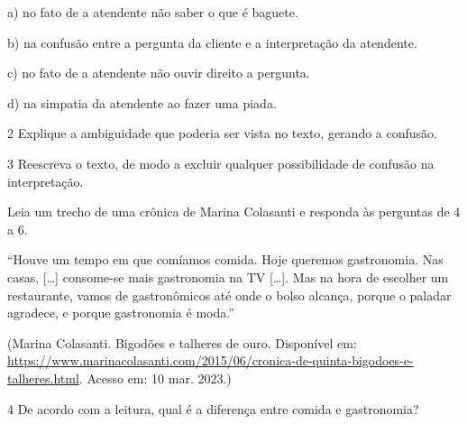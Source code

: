 {a) no fato de a atendente não saber o que é baguete.

b) na confusão entre a pergunta da cliente e a interpretação da
atendente.

c) no fato de a atendente não ouvir direito a pergunta.

d) na simpatia da atendente ao fazer uma piada.


\num{2} Explique a ambiguidade que poderia ser vista no texto, gerando a
confusão.



\num{3} Reescreva o texto, de modo a excluir qualquer possibilidade de
confusão na interpretação.



Leia um trecho de uma crônica de Marina Colasanti e responda às
perguntas de 4 a 6.

``Houve um tempo em que comíamos comida. Hoje queremos gastronomia. Nas
casas, {[}\ldots{]} consome-se mais gastronomia na TV {[}\ldots{]}. Mas
na hora de escolher um restaurante, vamos de gastronômicos até onde o
bolso alcança, porque o paladar agradece, e porque gastronomia é moda.''

(Marina Colasanti. Bigodões e talheres de ouro. Disponível em:
\url{https://www.marinacolasanti.com/2015/06/cronica-de-quinta-bigodoes-e-talheres.html}.
Acesso em: 10 mar. 2023.)

\num{4} De acordo com a leitura, qual é a diferença entre comida e
gastronomia?



}
